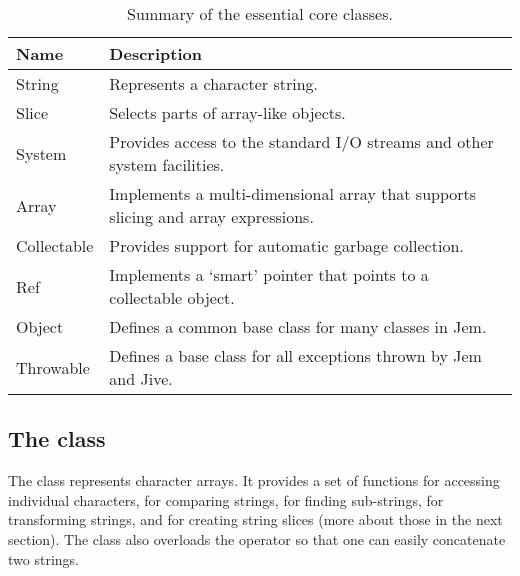 \begin{table}

  \caption{Summary of the essential core classes.}
  \label{table:jem-core}

  \begin{center}

    \begin{tabular}{|>{\ttfamily}lp{10cm}|}
      \hline
      Name       & Description \\
      \hline \hline
      String      & Represents a character string. \\
      Slice       & Selects parts of array-like objects. \\
      System      & Provides access to the standard I/O streams
                    and other system facilities. \\
      Array       & Implements a multi-dimensional array that
                    supports slicing and array expressions. \\
      Collectable & Provides support for automatic garbage
                    collection. \\
      Ref         & Implements a `smart' pointer that points to a
                    collectable object. \\
      Object      & Defines a common base class for many
                    classes in Jem. \\
      Throwable   & Defines a base class for all exceptions thrown
                    by Jem and Jive. \\
      \hline
    \end{tabular}

  \end{center}

\end{table}



\subsection*{The  class}

The  class represents character arrays. It provides a set of
functions for accessing individual characters, for comparing strings, for
finding sub-strings, for transforming strings, and for creating string
slices (more about those in the next section). The  class
also overloads the \Code{+} operator so that one can easily concatenate
two strings.

